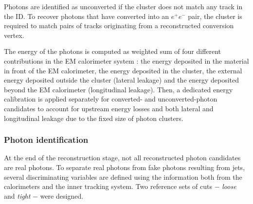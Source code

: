 \documentclass[12pt, twoside]{article}
\numberwithin{equation}{section}
\numberwithin{figure}{section}
\begin{document}
Photons are identified as unconverted if the cluster does not match any track in the ID. To recover photons that have converted into an $e^{+} e^{-}$ pair, the cluster is required to match pairs of tracks originating from a reconstructed conversion vertex.

The energy of the photons is computed as weighted sum of four different contributions in the EM calorimeter system \cite{photonReconstruction_1, photonReconstruction_2}: the energy deposited in the material in front of the EM calorimeter, the energy deposited in the cluster, the external energy deposited outside the cluster (lateral leakage) and the energy deposited beyond the EM calorimeter (longitudinal leakage). Then, a dedicated energy calibration is applied separately for converted- and unconverted-photon candidates to account for upstream energy losses and both lateral and longitudinal leakage due to the fixed size of photon clusters.

\subsubsection{Photon identification}
\label{subsubsec:PhotonIdentification}

At the end of the reconstruction stage, not all reconstructed photon candidates are real photons. To separate real photons from fake photons resulting from jets, several discriminating variables are defined using the information both from the calorimeters and the inner tracking system. Two reference sets of cuts $-$ \textit{loose} and \textit{tight} $-$ were designed.
\end{document}
